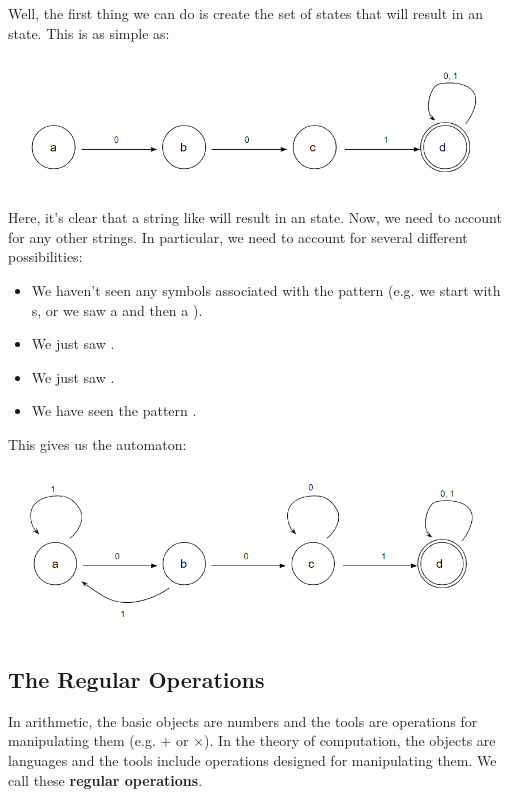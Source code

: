 \documentclass[letterpaper]{article}
\begin{document}
Well, the first thing we can do is create the set of states that will result in an  state. This is as simple as:
\begin{center}
    \includegraphics[scale=0.6]{../assets/state_1.png}
\end{center}
Here, it's clear that a string like  will result in an  state. Now, we need to account for any other strings. In particular, we need to account for several different possibilities:
\begin{itemize}
    \item We haven't seen any symbols associated with the pattern (e.g. we start with s, or we saw a  and then a ). 
    \item We just saw .
    \item We just saw .
    \item We have seen the pattern .
\end{itemize}
This gives us the automaton:
\begin{center}
    \includegraphics[scale=0.6]{../assets/state_2.png}
\end{center}

\subsection{The Regular Operations}
In arithmetic, the basic objects are numbers and the tools are operations for manipulating them (e.g. $+$ or $\times$). In the theory of computation, the objects are languages and the tools include operations designed for manipulating them. We call these \textbf{regular operations}.
\end{document}

